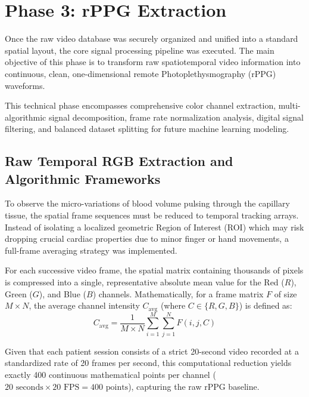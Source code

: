 \section{Phase 3: rPPG Extraction}
\label{sec:phase3_extraction}
Once the raw video database was securely organized and unified into a standard spatial layout, the core signal processing pipeline was executed. The main objective of this phase is to transform raw spatiotemporal video information into continuous, clean, one-dimensional remote Photoplethysmography (rPPG) waveforms. 

This technical phase encompasses comprehensive color channel extraction, multi-algorithmic signal decomposition, frame rate normalization analysis, digital signal filtering, and balanced dataset splitting for future machine learning modeling.

\subsection{Raw Temporal RGB Extraction and Algorithmic Frameworks}
To observe the micro-variations of blood volume pulsing through the capillary tissue, the spatial frame sequences must be reduced to temporal tracking arrays. Instead of isolating a localized geometric Region of Interest (ROI) which may risk dropping crucial cardiac properties due to minor finger or hand movements, a full-frame averaging strategy was implemented.

For each successive video frame, the spatial matrix containing thousands of pixels is compressed into a single, representative absolute mean value for the Red ($R$), Green ($G$), and Blue ($B$) channels. Mathematically, for a frame matrix $F$ of size $M \times N$, the average channel intensity $C_{\text{avg}}$ (where $C \in \{R, G, B\}$) is defined as:
\begin{equation}
C_{\text{avg}} = \frac{1}{M \times N} \sum_{i=1}^{M} \sum_{j=1}^{N} F(i, j, C)
\end{equation}

Given that each patient session consists of a strict 20-second video recorded at a standardized rate of 20 frames per second, this computational reduction yields exactly 400 continuous mathematical points per channel ($20\text{ seconds} \times 20\text{ FPS} = 400\text{ points}$), capturing the raw rPPG baseline. 


